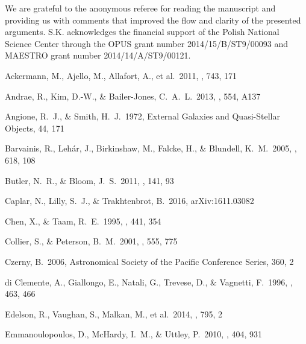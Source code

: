\documentclass[twocolumn]{aastex6}
\begin{document}

\acknowledgments

We are grateful to the anonymous referee for reading the manuscript and providing us with comments that 
improved the flow and clarity of the presented arguments.
S.K. acknowledges the financial support of the Polish National Science Center through the
OPUS grant number 2014/15/B/ST9/00093 and MAESTRO grant number 2014/14/A/ST9/00121.



\begin{thebibliography}{}

 Ackermann, M., Ajello, M., Allafort, A., et al.\ 2011, \apj, 743, 171

 Andrae, R., Kim, D.-W., \& Bailer-Jones, C.~A.~L.\ 2013, \aap, 554, A137

 Angione, R.~J., \& Smith, H.~J.\ 1972, External Galaxies and Quasi-Stellar Objects, 44, 171 

 Barvainis, R., Leh{\'a}r, J., Birkinshaw, M., Falcke, H., \& Blundell, K.~M.\ 2005, \apj, 618, 108

 Butler, N.~R., \& Bloom, J.~S.\ 2011, \aj, 141, 93

 Caplar, N., Lilly, S.~J., \& Trakhtenbrot, B.\ 2016, arXiv:1611.03082

 Chen, X., \& Taam, R.~E.\ 1995, \apj, 441, 354 

 Collier, S., \& Peterson, B.~M.\ 2001, \apj, 555, 775 

 Czerny, B.\ 2006, Astronomical Society of the Pacific Conference Series, 360, 2

 di Clemente, A., Giallongo, E., Natali, G., Trevese, D., \& Vagnetti, F.\ 1996, \apj, 463, 466 

 Edelson, R., Vaughan, S., Malkan, M., et al.\ 2014, \apj, 795, 2 

 Emmanoulopoulos, D., McHardy, I.~M., \& Uttley, P.\ 2010, \mnras, 404, 931 


\end{thebibliography}
\end{document}
